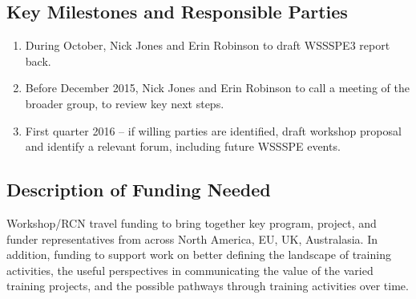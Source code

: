 \subsection{Key Milestones and Responsible Parties}
\begin{enumerate}

\item During October, Nick Jones and Erin Robinson to draft WSSSPE3 report back.

\item Before December 2015, Nick Jones and Erin Robinson to call a meeting of
the broader group, to review key next steps.
    
\item First quarter 2016 -- if willing parties are identified, draft workshop proposal
and identify a relevant forum, including future WSSSPE events.
    
\end{enumerate}

\subsection{Description of Funding Needed}

Workshop/RCN travel funding to bring together key program, project, and funder
representatives from across North America, EU, UK, Australasia. In addition,
funding to support work on better defining the landscape of training activities,
the useful perspectives in communicating the value of the varied training
projects, and the possible pathways through training activities over time.
